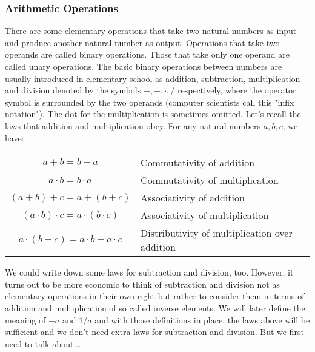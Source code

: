 \subsubsection{Arithmetic Operations}
There are some elementary operations that take two natural numbers as input and produce another natural number as output. Operations that take two operands are called binary operations. Those that take only one operand are called unary operations. The basic binary operations between numbers are usually introduced in elementary school as addition, subtraction, multiplication and division denoted by the symbols $+,-,\cdot,/$ respectively, where the operator symbol is surrounded by the two operands (computer scientists call this "infix notation"). The dot for the multiplication is sometimes omitted. Let's recall the laws that addition and multiplication obey. For any natural numbers $a,b,c$, we have:

\medskip
\begin{tabular}{c l}
  $a + b = b + a$                             & Commutativity of addition \\
  $a \cdot b = b \cdot a$                     & Commutativity of multiplication \\
  $(a + b) + c = a + (b + c)$                 & Associativity of addition \\
  $(a \cdot b) \cdot c = a \cdot (b \cdot c)$ & Associativity of multiplication \\
  $a \cdot (b + c) = a \cdot b + a \cdot c$   & Distributivity of multiplication over addition
\end{tabular}
\medskip

We could write down some laws for subtraction and division, too. However, it turns out to be more economic to think of subtraction and division not as elementary operations in their own right but rather to consider them in terms of addition and multiplication of so called inverse elements. We will later define the meaning of $-a$ and $1/a$ and with those definitions in place, the laws above will be sufficient and we don't need extra laws for subtraction and division. But we first need to talk about...


